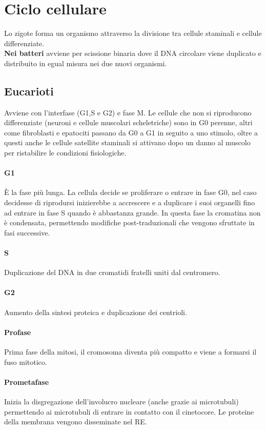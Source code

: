 \documentclass[10pt]{article}
\begin{document}
\section*{Ciclo cellulare}
Lo zigote forma un organismo attraverso la divisione tra cellule staminali e cellule differenziate. \\
\textbf{Nei batteri} avviene per scissione binaria dove il DNA circolare viene duplicato e distribuito in egual misura nei due nuovi organismi.
\subsection*{Eucarioti}
Avviene con l'interfase (G1,S e G2) e fase M. Le cellule che non si riproducono differenziate (neuroni e cellule muscolari scheletriche) sono in G0 perenne, altri come fibroblasti e epatociti passano da G0 a G1 in seguito a uno stimolo, oltre a questi anche le cellule satellite staminali si attivano dopo un danno al muscolo per ristabilire le condizioni fisiologiche.
\paragraph*{G1} È la fase più lunga. La cellula decide se proliferare o entrare in fase G0, nel caso decidesse di riprodursi inizierebbe a accrescere e a duplicare i suoi organelli fino ad entrare in fase S quando è abbastanza grande. In questa fase la cromatina non è condensata, permettendo modifiche post-traduzionali che vengono sfruttate in fasi successive.
\paragraph*{S} Duplicazione del DNA in due cromatidi fratelli uniti dal centromero.
\paragraph*{G2} Aumento della sintesi proteica e duplicazione dei centrioli.
\paragraph*{Profase} Prima fase della mitosi, il cromosoma diventa più compatto e viene a formarsi il fuso mitotico.
\paragraph*{Prometafase} Inizia la disgregazione dell'involucro nucleare (anche grazie ai microtubuli) permettendo ai microtubuli di entrare in contatto con il cinetocore. Le proteine della membrana vengono disseminate nel RE. 
\end{document}
